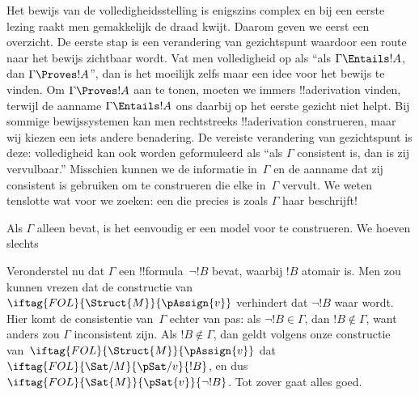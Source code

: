 \documentclass[openany]{memoir}
\begin{document}
Het bewijs van de volledigheidsstelling is enigszins complex en bij
een eerste lezing raakt men gemakkelijk de draad kwijt. Daarom geven
we eerst een overzicht. De eerste stap is een verandering van
gezichtspunt waardoor een route naar het bewijs zichtbaar wordt. Vat
men volledigheid op als ``als $\Gamma \Entails !A$, dan $\Gamma
\Proves !A$'', dan is het moeilijk zelfs maar een idee voor het bewijs
te vinden. Om $\Gamma \Proves !A$ aan te tonen, moeten we immers
!!a{derivation} vinden, terwijl de aanname $\Gamma \Entails !A$ ons
daarbij op het eerste gezicht niet helpt. Bij sommige bewijssystemen
kan men rechtstreeks !!a{derivation} construeren, maar wij kiezen een
iets andere benadering. De vereiste verandering van gezichtspunt is
deze: volledigheid kan ook worden geformuleerd als ``als $\Gamma$
consistent is, dan is zij vervulbaar.'' Misschien kunnen we de
informatie in~$\Gamma$ en de aanname dat zij consistent is gebruiken
om  te construeren die elke
 in~$\Gamma$ vervult. We weten
tenslotte wat voor  we zoeken:
een die precies is zoals $\Gamma$ haar beschrijft!{}

Als $\Gamma$ alleen  bevat, is het eenvoudig
er een model voor te construeren. We hoeven slechts

Veronderstel nu dat $\Gamma$ een !!{formula}~$\lnot !B$ bevat, waarbij
$!B$ atomair is. Men zou kunnen vrezen dat de constructie van
$\iftag{FOL}{\Struct{M}}{\pAssign{v}}$ verhindert dat $\lnot !B$ waar
wordt. Hier komt de consistentie van~$\Gamma$ echter van pas: als
$\lnot !B \in \Gamma$, dan $!B \notin \Gamma$, want anders zou
$\Gamma$ inconsistent zijn. Als $!B \notin \Gamma$, dan geldt volgens
onze constructie van~$\iftag{FOL}{\Struct{M}}{\pAssign{v}}$ dat
$\iftag{FOL}{\Sat/{M}}{\pSat/{v}}{!B}$, en dus
$\iftag{FOL}{\Sat{M}}{\pSat{v}}{\lnot !B}$. Tot zover gaat alles goed.
\end{document}
